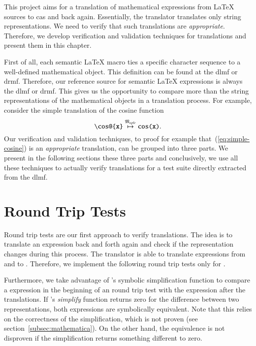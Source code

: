 This project aims for a translation of mathematical expressions from \LaTeX{} sources to \gls{cas} and back again. Essentially, the translator translates only string representations. We need to verify that such translations are \textit{appropriate}. Therefore, we develop verification and validation techniques for translations and present them in this chapter.

First of all, each semantic \LaTeX{} macro ties a specific character sequence to a well-defined mathematical object. This definition can be found at the \gls{dlmf} or \gls{drmf}. Therefore, our reference source for semantic \LaTeX{} expressions is always the \gls{dlmf} or \gls{drmf}. This gives us the opportunity to compare more than the string representations of the mathematical objects in a translation process. For example, consider the simple translation of the cosine function
\begin{equation}\label{eq:simple-cosine}
\verb|\cos@{x}| \overset{\langMaple}{\mapsto} \texttt{cos(x)}.
\end{equation}
Our verification and validation techniques, to proof for example that~(\ref{eq:simple-cosine}) is an \textit{appropriate} translation, can be grouped into three parts. We present in the following sections these three parts and conclusively, we use all these techniques to actually verify translations for a test suite directly extracted from the \gls{dlmf}.

\section{Round Trip Tests}\label{sec:round-trip}
Round trip tests are our first approach to verify translations. The idea is to translate an expression back and forth again and check if the representation changes during this process. The translator is able to translate expressions from and to \Maple. Therefore, we implement the following round trip tests only for \Maple.

Furthermore, we take advantage of \Maple's symbolic simplification function to compare a \Maple{} expression in the beginning of an round trip test with the \Maple{} expression after the translations. If \Maple's \textit{simplify} function returns zero for the difference between two representations, both expressions are symbolically equivalent. Note that this relies on the correctness of the simplification, which is not proven (see section~\ref{subsec:mathematica}). On the other hand, the equivalence is not disproven if the simplification returns something different to zero.

